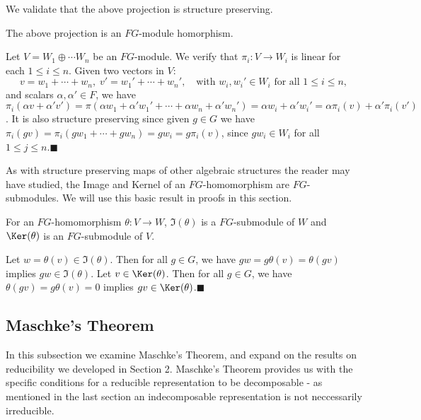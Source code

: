 \documentclass[../Project.tex]{subfiles}
\begin{document}
We validate that the above projection is structure preserving.

\begin{prop}[{\cite[Proposition 7.11]{2}}]
\label{projishom}
	The above projection is an $FG$-module homorphism.
\end{prop}
\begin{proo*}[{\cite[Proposition 7.11]{2}}]  
	Let $V = W_1 \oplus \cdots W_n$ be an $FG$-module. We verify that $\pi_i : V \to W_i$ is linear for each $1 \leqslant i \leqslant n$. Given two vectors in $V$:
	$$v = w_1 + \cdots + w_n,\;v' = w_1' + \cdots + w_n', \quad \text{with }w_i,w_i' \in W_i \text{ for all } 1 \leqslant i \leqslant n,$$
	and scalars $\alpha,\alpha' \in F$, we have $\pi_i(\alpha v + \alpha'v') = \pi(\alpha w_1 + \alpha'w_1' + \cdots + \alpha w_n + \alpha'w_n') = \alpha w_i + \alpha'w_i' = \alpha \pi_i(v) + \alpha'\pi_i(v')$. It is also structure preserving since given $g \in G$ we have $\pi_i(gv) = \pi_i(gw_1+ \cdots + gw_n) = gw_i = g\pi_i(v)$, since $gw_i \in W_i$ for all $1 \leqslant j \leqslant n$.\hfill$\blacksquare$\\
\end{proo*}


As with structure preserving maps of other algebraic structures the reader may have studied, the Image and Kernel of an $FG$-homomorphism are $FG$-submodules. We will use this basic result in proofs in this section.
\begin{prop}
	For an $FG$-homomorphism $\theta : V \to W$, $\Im(\theta)$ is a $FG$-submodule of $W$ and $\Ker(\theta)$ is an $FG$-submodule of $V$.
\label{ImKerSub}
\end{prop}
\begin{proo*}
	Let $w = \theta(v) \in \Im(\theta)$. Then for all $g \in G$, we have $gw = g\theta(v) = \theta(gv)$ implies $gw \in \Im(\theta)$. Let $v \in \Ker(\theta)$. Then for all $g \in G$, we have $\theta(gv) = g\theta(v) = 0$ implies $gv \in \Ker(\theta)$.\hfill $\blacksquare$
\end{proo*}



\newpage
\subsection{Maschke's Theorem}
In this subsection we examine Maschke's Theorem, and expand on the results on reducibility we developed in Section 2. Maschke's Theorem provides us with the specific conditions for a reducible representation to be decomposable - as mentioned in the last section an indecomposable representation is not neccessarily irreducible.\\
\end{document}
